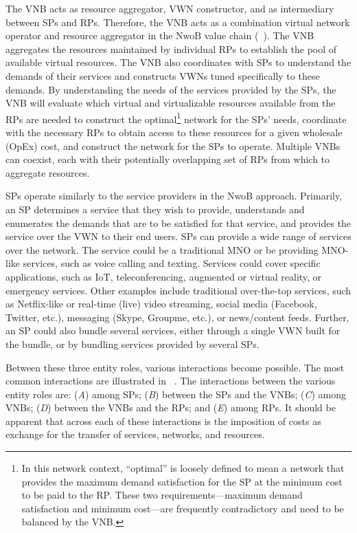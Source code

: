 \documentclass[12pt,dvipsnames]{report}
\begin{document}
The VNB acts as resource aggregator, VWN constructor, and as intermediary between SPs and RPs.  Therefore, the VNB acts as a combination virtual network operator and resource aggregator in the NwoB value chain (~\cite{6737248}).  The VNB aggregates the resources maintained by individual RPs to establish the pool of available virtual resources.  The VNB also coordinates with SPs to understand the demands of their services and constructs VWNs tuned specifically to these demands.  By understanding the needs of the services provided by the SPs, the VNB will evaluate which virtual and virtualizable resources available from the RPs are needed to construct the optimal\footnote{In this network context, ``optimal'' is loosely defined to mean a network that provides the maximum demand satisfaction for the SP at the minimum cost to be paid to the RP.  These two requirements---maximum demand satisfaction and minimum cost---are frequently contradictory and need to be balanced by the VNB.} network for the SPs' needs, coordinate with the necessary RPs to obtain access to these resources for a given wholesale (OpEx) cost, and construct the network for the SPs to operate.  Multiple VNBs can coexist, each with their potentially overlapping set of RPs from which to aggregate resources.

SPs operate similarly to the service providers in the NwoB approach.  Primarily, an SP determines a service that they wish to provide, understands and enumerates the demands that are to be satisfied for that service, and provides the service over the VWN to their end users.  SPs can provide a wide range of services over the network.  The service could be a traditional MNO or be providing MNO-like services, such as voice calling and texting.  Services could cover specific applications, such as IoT, teleconferencing, augmented or virtual reality, or emergency services.  Other examples include traditional over-the-top services, such as Netflix-like or real-time (live) video streaming, social media (Facebook, Twitter, etc.), messaging (Skype, Groupme, etc.), or news/content feeds.  Further, an SP could also bundle several services, either through a single VWN built for the bundle, or by bundling services provided by several SPs.

Between these three entity roles, various interactions become possible.  The most common interactions are illustrated in ~\cite{MJ_MECOMM_17}.  The interactions between the various entity roles are: (\emph{A}) among SPs; (\emph{B}) between the SPs and the VNBs; (\emph{C}) among VNBs; (\emph{D}) between the VNBs and the RPs; and (\emph{E}) among RPs.  It should be apparent that across each of these interactions is the imposition of costs as exchange for the transfer of services, networks, and resources.
\end{document}
